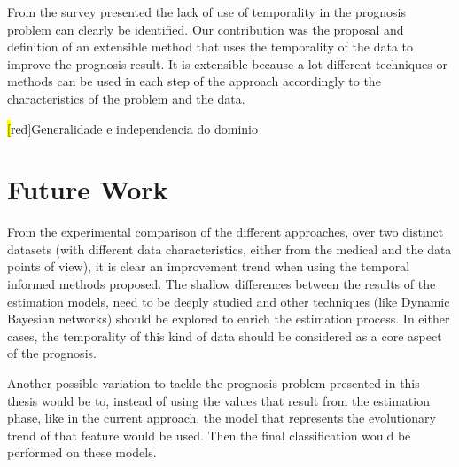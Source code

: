 From the survey presented the lack of use of temporality in the prognosis problem can clearly be identified. 
Our contribution was the proposal and definition of an extensible method that uses the temporality of the data to improve the prognosis result. It is extensible because a lot different techniques or methods can be used in each step of the approach accordingly to the characteristics of the problem and the data.

\hl[red]{Generalidade e independencia do dominio}


\section{Future Work}
\label{section:future}

From the experimental comparison of the different approaches, over two distinct datasets (with different data characteristics,
 either from the medical and the data points of view), it is clear an improvement trend when using the temporal informed
 methods proposed. The shallow differences between the results of the estimation models, need to be deeply studied and other
 techniques (like Dynamic Bayesian networks) should be explored to enrich the estimation process. In either cases,
 the temporality of this kind of data should be considered as a core aspect of the prognosis.
 
Another possible variation to tackle the prognosis problem presented in this thesis would be to, instead of using the 
values that result from the estimation phase, like in the current approach, the model that represents the evolutionary trend of that
 feature would be used. Then the final classification would be performed on these models.

\cleardoublepage

